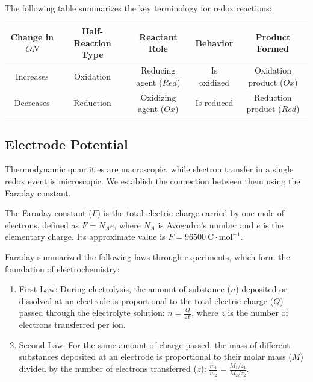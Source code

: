 The following table summarizes the key terminology for redox reactions:

\begin{definition}
\begin{center}
\begin{tabular}{c c c c c}
    \toprule
    Change in $ON$ & Half-Reaction Type & Reactant Role & Behavior & Product Formed \\
    \midrule
    Increases & Oxidation & Reducing agent ($Red$) & Is oxidized & Oxidation product ($Ox$) \\
    Decreases & Reduction & Oxidizing agent ($Ox$) & Is reduced & Reduction product ($Red$) \\
    \bottomrule
\end{tabular}
\end{center}
\end{definition}

\subsection{Electrode Potential}

Thermodynamic quantities are macroscopic, while electron transfer in a single redox event is microscopic. We establish the connection between them using the Faraday constant.

\begin{definition}
The Faraday constant ($F$) is the total electric charge carried by one mole of electrons, defined as $F = N_A e$, where $N_A$ is Avogadro's number and $e$ is the elementary charge. Its approximate value is $F = 96500\ \mathrm{C\cdot mol^{-1}}$.
\end{definition}

Faraday summarized the following laws through experiments, which form the foundation of electrochemistry:

\begin{proposition}
\begin{enumerate}
    \item First Law: During electrolysis, the amount of substance ($n$) deposited or dissolved at an electrode is proportional to the total electric charge ($Q$) passed through the electrolyte solution: $n = \frac{Q}{zF}$, where $z$ is the number of electrons transferred per ion.
    \item Second Law: For the same amount of charge passed, the mass of different substances deposited at an electrode is proportional to their molar mass ($M$) divided by the number of electrons transferred ($z$): $\frac{m_1}{m_2} = \frac{M_1/z_1}{M_2/z_2}$.
\end{enumerate}
\end{proposition}

